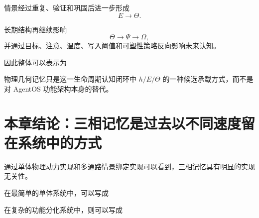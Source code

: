 情景经过重复、验证和巩固后进一步形成
\[
E\rightarrow\Theta.
\]

长期结构再继续影响
\[
\Theta
\rightarrow
\Psi
\rightarrow
\Omega,
\]
并通过目标、注意、温度、写入阈值和可塑性策略反向影响未来认知。

因此整体可以表示为
\begin{statementbox}
\centering
{}
\end{statementbox}

物理几何记忆只是这一生命周期认知闭环中 $h/E/\Theta$ 的一种候选承载方式，而不是对 AgentOS 功能架构本身的替代。

\section{本章结论：三相记忆是过去以不同速度留在系统中的方式}

通过单体物理动力实现和多通路情景绑定实现可以看到，三相记忆具有明显的实现无关性。

在最简单的单体系统中，可以写成
\begin{statementbox}
\centering
{}
\end{statementbox}
\begin{statementbox}
\centering
{}
\end{statementbox}
\begin{statementbox}
\centering
{}
\end{statementbox}

在复杂的功能分化系统中，则可以写成
\begin{statementbox}
\centering
{}
\end{statementbox}
\begin{statementbox}
\centering
{}
\end{statementbox}
\begin{statementbox}
\centering
{}
\end{statementbox}


